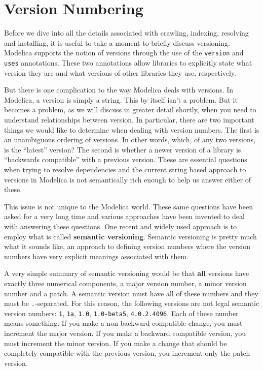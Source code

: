 \documentclass[11pt,a4paper,twocolumn]{article}
\newcommand{\code}[1]{\texttt{#1}} %
\begin{document}
\section{Version Numbering}
\label{sec:numbers}

Before we dive into all the details associated with crawling,
indexing, resolving and installing, it is useful to take a moment to
briefly discuss versioning.  Modelica supports the notion of versions
through the use of the \texttt{version} and \texttt{uses} annotations.  These two
annotations allow libraries to explicitly state what version they are
and what versions of other libraries they use, respectively.

But there is one complication to the way Modelica deals with versions.
In Modelica, a version is simply a string.  This by itself isn't a
problem.  But it becomes a problem, as we will discuss in greater
detail shortly, when you need to understand relationships between
version.  In particular, there are two important things we would like
to determine when dealing with version numbers.  The first is an
unambiguous ordering of versions.  In other words, which, of any two
versions, is the ``latest'' version?  The second is whether a newer
version of a library is ``backwards compatible'' with a previous
version.  These are essential questions when trying to resolve
dependencies and the current string based approach to versions in
Modelica is not semantically rich enough to help us answer either of
these.

This issue is not unique to the Modelica world.  These same questions
have been asked for a very long time and various approaches have been
invented to deal with answering these questions.  One recent and
widely used approach is to employ what is called \textbf{semantic
  versioning}\parencite{semver}.  Semantic versioning is pretty much what
it sounds like, an approach to defining version numbers where the
version numbers have very explicit meanings associated with them.

A very simple summary of semantic versioning would be that \textbf{all}
versions have exactly three numerical components, a major version
number, a minor version number and a patch.  A semantic version must
have all of these numbers and they must be \texttt{.}-separated.  For this
reason, the following versions are not legal semantic version numbers:
\code{1}, \code{1a}, \code{1.0}, \code{1.0-beta5}, \code{4.0.2.4096}.
Each of these number means something.  If you make a non-backward
compatible change, you must increment the major version.  If you make
a backward compatible version, you must increment the minor version.
If you make a change that should be completely compatible with the
previous version, you increment only the patch version.
\end{document}
